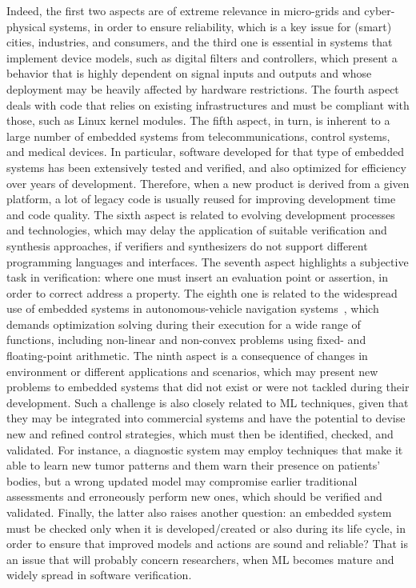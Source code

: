\documentclass[format=acmsmall, review=false, screen=true]{acmart}
\begin{document}
Indeed, the first two aspects are of extreme relevance in micro-grids and cyber-physical systems, in order to ensure reliability, which is a key issue for (smart) cities, industries, and consumers, and the third one is essential in systems that implement device models, such as digital filters and controllers, which present a behavior that is highly dependent on signal inputs and outputs and whose deployment may be heavily affected by hardware restrictions. The fourth aspect deals with code that relies on existing infrastructures and must be compliant with those, such as Linux kernel modules. The fifth aspect, in turn, is inherent to a large number of embedded systems from  telecommunications, control systems, and medical devices. In particular, software developed for that type of embedded systems has been extensively tested and verified, and also optimized for efficiency over years of development. Therefore, when a new product is derived from a given platform, a lot of legacy code is usually reused for improving development time and code quality. The sixth aspect is related to evolving development processes and technologies, which may delay the application of suitable verification and synthesis approaches, if verifiers and synthesizers do not support different programming languages and interfaces. The seventh aspect highlights a subjective task in verification: where one must insert an evaluation point or assertion, in order to correct address a property. The eighth one is related to the widespread use of embedded systems in autonomous-vehicle navigation systems~\cite{Adouane16}, which demands optimization solving during their execution for a wide range of functions, including non-linear and non-convex problems using fixed- and floating-point arithmetic. The ninth aspect is a consequence of changes in environment or different applications and scenarios, which may present new problems to embedded systems that did not exist or were not tackled during their development. Such a challenge is also closely related to ML techniques, given that they may be integrated into commercial systems and have the potential to devise new and refined control strategies, which must then be identified, checked, and validated. For instance, a diagnostic system may employ techniques that make it able to learn new tumor patterns and them warn their presence on patients' bodies, but a wrong updated model may compromise earlier traditional assessments and erroneously perform new ones, which should be verified and validated. Finally, the latter also raises another question: an embedded system must be checked only when it is developed/created or also during its life cycle, in order to ensure that improved models and actions are sound and reliable? That is an issue that will probably concern researchers, when ML becomes mature and widely spread in software verification.
\end{document}
